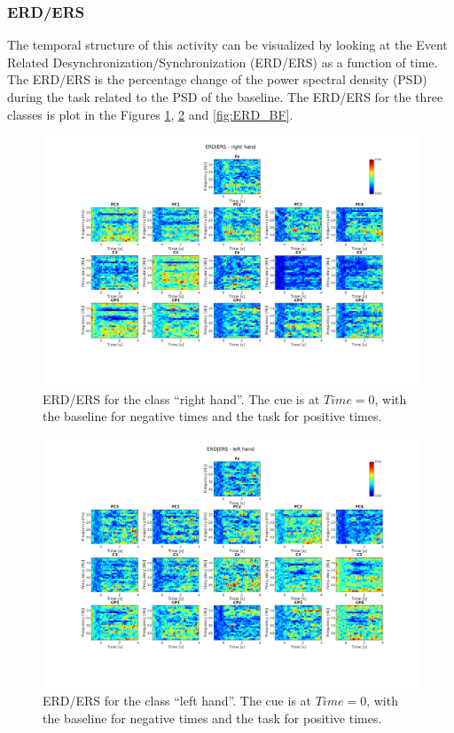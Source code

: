 \subsubsection{ERD/ERS}
The temporal structure of this activity can be visualized by looking at the Event Related Desynchronization/Synchronization (ERD/ERS) as a function of time.
The ERD/ERS is the percentage change of the power spectral density (PSD) during the task related to the PSD of the baseline.
The ERD/ERS for the three classes is plot in the Figures \ref{fig:ERD_RH}, \ref{fig:ERD_LH} and \ref{fig:ERD_BF}.
\begin{figure}
   \centering
   \includegraphics[width=\textwidth]{images/ERD_RH.png}
   \caption{ERD/ERS for the class ``right hand''. The cue is at $Time = 0$, with the baseline for negative times and the task for positive times.}
   \label{fig:ERD_RH}
\end{figure}
\begin{figure}
   \centering
   \includegraphics[width=\textwidth]{images/ERD_LH.png}
   \caption{ERD/ERS for the class ``left hand''. The cue is at $Time = 0$, with the baseline for negative times and the task for positive times.}
   \label{fig:ERD_LH}
\end{figure}
